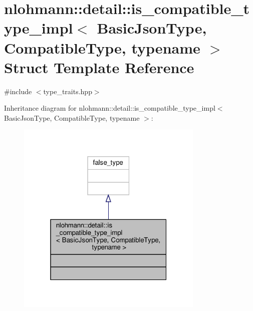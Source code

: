 \hypertarget{structnlohmann_1_1detail_1_1is__compatible__type__impl}{}\section{nlohmann\+:\+:detail\+:\+:is\+\_\+compatible\+\_\+type\+\_\+impl$<$ Basic\+Json\+Type, Compatible\+Type, typename $>$ Struct Template Reference}
\label{structnlohmann_1_1detail_1_1is__compatible__type__impl}


{\ttfamily \#include $<$type\+\_\+traits.\+hpp$>$}



Inheritance diagram for nlohmann\+:\+:detail\+:\+:is\+\_\+compatible\+\_\+type\+\_\+impl$<$ Basic\+Json\+Type, Compatible\+Type, typename $>$\+:\nopagebreak
\begin{figure}[H]
\begin{center}
\leavevmode
\includegraphics[width=253pt]{structnlohmann_1_1detail_1_1is__compatible__type__impl__inherit__graph}
\end{center}
\end{figure}


